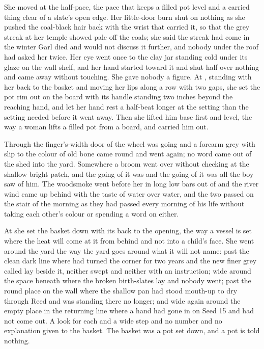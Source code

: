 She moved at the half-pace, the pace that keeps a filled pot level and a carried thing clear of a slate's open edge. Her little-door burn shut on nothing as she pushed the coal-black hair back with the wrist that carried it, so that the grey streak at her temple showed pale off the coals; she said the streak had come in the winter Garl died and would not discuss it further, and nobody under the roof had asked her twice. Her eye went once to the clay jar standing cold under its glaze on the wall shelf, and her hand started toward it and shut half over nothing and came away without touching. She gave nobody a figure. At , standing with her back to the basket and moving her lips along a row with two gaps, she set the pot rim out on the board with its handle standing two inches beyond the reaching hand, and let her hand rest a half-beat longer at the setting than the setting needed before it went away. Then she lifted him base first and level, the way a woman lifts a filled pot from a board, and carried him out.

Through the finger's-width door of  the wheel was going and a forearm grey with slip to the colour of old bone came round and went again; no word came out of the shed into the yard. Somewhere a broom went over  without checking at the shallow bright patch, and the going of it was  and the going of it was all the boy saw of him. The woodsmoke went before her in long low bars out of  and the river wind came up behind with the taste of water over water, and the two passed on the stair of the morning as they had passed every morning of his life without taking each other's colour or spending a word on either.

At  she set the basket down with its back to the opening, the way a vessel is set where the heat will come at it from behind and not into a child's face. She went around the yard the way the yard goes around what it will not name: past the clean dark line where  had turned the corner for two years and the new finer grey called  lay beside it, neither swept and neither with an instruction; wide around the space beneath  where the broken birth-slates lay and nobody went; past the round place on the wall where the shallow pan had stood mouth-up to dry through Reed and was standing there no longer; and wide again around the empty place in the returning line where a hand had gone in on Seed 15 and had not come out. A look for each and a wide step and no number and no explanation given to the basket. The basket was a pot set down, and a pot is told nothing.

